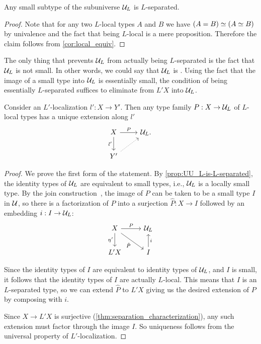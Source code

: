 \begin{prp}\label{prop:UU_L-is-L-separated}
Any small subtype of the subuniverse $\mathcal{U}_L$ is $L$-separated.
\end{prp}

\begin{proof}
    Note that for any two $L$-local types $A$ and $B$ we have $\eqv{(A=B)}{(\eqv{A}{B})}$ by univalence and the
    fact that being $L$-local is a mere proposition. Therefore the claim follows from \cref{cor:local_equiv}.
\end{proof}

The only thing that prevents $\mathcal{U}_L$ from actually being $L$-separated is the fact that $\mathcal{U}_L$ is not small. In other words, we could say that $\mathcal{U}_L$ is . Using the fact that the image of a small type into $\mathcal{U}_L$ is essentially small, the condition of being essentially $L$-separated suffices to eliminate from $L'X$ into $\mathcal{U}_L$.

\begin{lem}\label{lemma:extendtoUL}
Consider an $L'$-localization $l':X\to Y'$. Then any type family $P:X\to\mathcal{U}_L$ of $L$-local types has a unique extension along $l'$
\begin{equation*}
\begin{tikzcd}
X \arrow[d,swap,"{l'}"] \arrow[r,"P"] & \UU_L. \\
Y' \arrow[ur,densely dotted]
\end{tikzcd}
\end{equation*}
\end{lem}

\begin{proof}
    We prove the first form of the statement.
    By \cref{prop:UU_L-is-L-separated}, the identity types of $\mathcal{U}_L$ are
    equivalent to small types, i.e., $\mathcal{U}_L$ is a locally small type.
    By the join construction~\cite{joinconstruction}, the image of $P$
    can be taken to be a small type $I$ in $\mathcal{U}$, so there is a factorization
    of $P$ into a surjection $\hat{P} : X \to I$ followed by
    an embedding $i : I \to \mathcal{U}_L$:
\begin{equation*}
\begin{tikzcd}
X \arrow[d,swap,"\modalunit'"] \arrow[r,"P"] \arrow[dr,swap,"\hat{P}"] & \UU_L \\
L'X & I \arrow[u,swap,"i"] 
\end{tikzcd}
\end{equation*}

    Since the identity types of $I$ are equivalent to identity types
    of $\mathcal{U}_L$, and $I$ is small, it follows that the identity types of $I$ are actually $L$-local.
    This means that $I$ is an $L$-separated type, so we can extend $\hat{P}$ to $L' X$ 
    giving us the desired extension of $P$ by composing with $i$.

    Since $X \to L'X$ is surjective (\cref{thm:separation_characterization}),
    any such extension must factor through the image $I$.
    So uniqueness follows from the universal property of $L'$-localization.
\end{proof}

